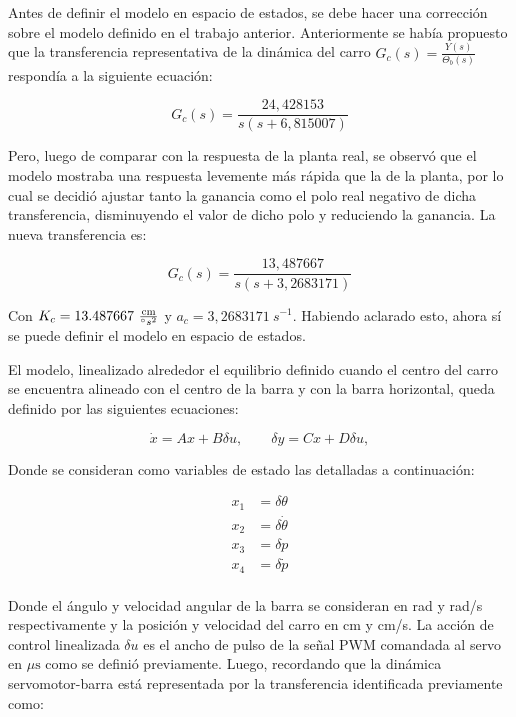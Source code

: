 \documentclass[a4paper, twoside, 10pt, spanish]{article}
\numberwithin{table}{section}
\begin{document}
Antes de definir el modelo en espacio de estados, se debe hacer una corrección sobre el modelo definido en el trabajo anterior. Anteriormente se había propuesto que la transferencia representativa de la dinámica del carro $G_c(s) = \frac{Y(s)}{\Theta_b(s)}$ respondía a la siguiente ecuación:

\begin{equation}
    G_c(s) = \frac{24,428153}{s(s + 6,815007)}
\end{equation}

Pero, luego de comparar con la respuesta de la planta real, se observó que el modelo mostraba una respuesta levemente más rápida que la de la planta, por lo cual se decidió ajustar tanto la ganancia como el polo real negativo de dicha transferencia, disminuyendo el valor de dicho polo y reduciendo la ganancia. La nueva transferencia es:

\begin{equation}
    G_c(s) = \frac{13,487667}{s(s + 3,2683171)}
\end{equation}

Con $K_c = 13.487667 \ \frac{\text{cm}}{\degree s^2}$ y $a_c = 3,2683171 \ s^{-1}$. Habiendo aclarado esto, ahora sí se puede definir el modelo en espacio de estados.

El modelo, linealizado alrededor el equilibrio definido cuando el centro del carro se encuentra alineado con el centro de la barra y con la barra horizontal, queda definido por las siguientes ecuaciones:

\begin{equation}
    \dot x=Ax+B\delta u,\qquad \delta y=Cx+D\delta u,
\end{equation}

Donde se consideran como variables de estado las detalladas a continuación:

\begin{align}
    x_1 &= \delta\theta\\
    x_2 &= \delta\dot{\theta}\\
    x_3 &= \delta p\\
    x_4 &= \delta\dot{p}\\
\end{align}

Donde el ángulo y velocidad angular de la barra se consideran en rad y rad/s respectivamente y la posición y velocidad del carro en cm y cm/s. La acción de control linealizada $\delta u$ es el ancho de pulso de la señal PWM comandada al servo en $\mu \text{s}$ como se definió previamente. Luego, recordando que la dinámica servomotor-barra está representada por la transferencia identificada previamente como:
\end{document}
